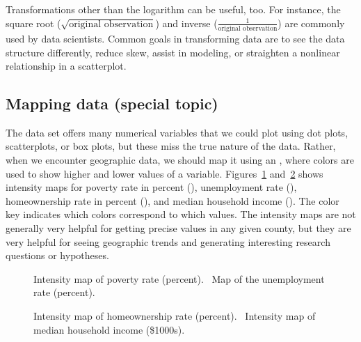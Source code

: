 Transformations other than the logarithm can be useful, too.
For instance, the square root
($\sqrt{\text{original observation}}$) and inverse
($\frac{1}{\text{original observation}}$) are commonly used
by data scientists.
Common goals in transforming data are to see the data
structure differently, reduce skew, assist in modeling,
or straighten a nonlinear relationship in a scatterplot.



\subsection{Mapping data (special topic)}


The  data set offers many numerical variables
that we could plot using dot plots, scatterplots,
or box plots, but these miss the true nature of the data.
Rather, when we encounter geographic data, we should map
it using an , where colors are used
to show higher and lower values of a variable.
Figures~\ref{countyIntensityMaps1}
and~\ref{countyIntensityMaps2} shows intensity maps for
poverty rate in percent (),
unemployment rate (),
homeownership rate in percent (),
and median household income
().
The color key indicates which colors correspond to which values.
The intensity maps are not generally very helpful
for getting precise values in any given county,
but they are very helpful for seeing geographic trends
and generating interesting research questions or hypotheses.

\begin{figure}
  \centering
  \caption{ Intensity map of
      poverty rate (percent).
      ~Map of the
      unemployment rate (percent).}
  \label{countyIntensityMaps1}
\end{figure}

\begin{figure}
  \centering
  \caption{ Intensity map
      of homeownership rate (percent).
      ~Intensity map of median
      household income (\$1000s).}
\label{countyIntensityMaps2}
\end{figure}

